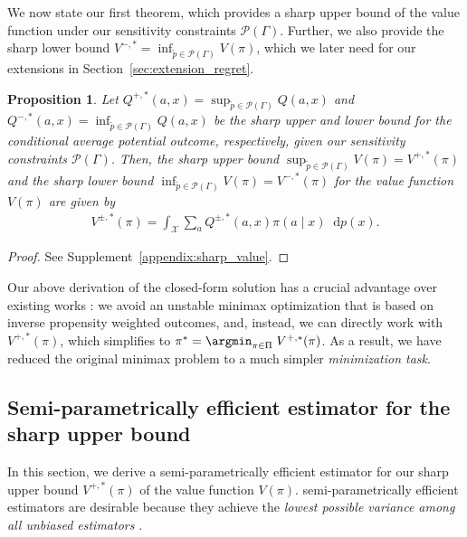 \documentclass{article} %
\theoremstyle{plain}
\newtheorem{proposition}[theorem]{Proposition}
\theoremstyle{definition}
\theoremstyle{remark}
\newcommand*\diff{\mathop{}\!\mathrm{d}}
\begin{document}
We now state our first theorem, which provides a sharp upper bound of the value function under our sensitivity constraints $\mathcal{P}(\Gamma)$. Further, we also provide the sharp lower bound $V^{-,*}=\inf_{\tilde{p}\in\mathcal{P}(\Gamma)}V(\pi)$, which we later need for our extensions in Section~\ref{sec:extension_regret}.

\begin{proposition}\label{prop:sharp_value}
    Let $Q^{+,*}(a,x) = \sup_{\tilde{p}\in \mathcal{P}(\Gamma)}Q(a,x)$ and $Q^{-,*}(a,x) = \inf_{\tilde{p}\in \mathcal{P}(\Gamma)}Q(a,x)$ be the sharp upper and lower bound for the conditional average potential outcome, respectively, given our sensitivity constraints $\mathcal{P}(\Gamma)$. Then, the sharp upper bound $\sup_{\tilde{p}\in \mathcal{P}(\Gamma)}V(\pi)=V^{+,*}(\pi)$ and the sharp lower bound $\inf_{\tilde{p}\in \mathcal{P}(\Gamma)}V(\pi)=V^{-,*}(\pi)$ for the value function $V(\pi)$ are given by
    \begin{align}\label{eq:sharp_value}
        V^{\pm,*}(\pi) = \int_\mathcal{X} \sum_a  Q^{\pm,*}(a,x) \pi(a\mid x) \diff p(x).
    \end{align}
\end{proposition}
\begin{proof}
    See Supplement~\ref{appendix:sharp_value}.
\end{proof}


Our above derivation of the closed-form solution has a crucial advantage over existing works \citep{Kallus.2018c, Kallus.2021d}: we avoid an unstable minimax optimization that is based on inverse propensity weighted outcomes, and, instead, we can directly work with $V^{+,*}(\pi)$, which simplifies  to
     $\pi^* = \argmin_{\pi \in \Pi} \; V^{+,*}(\pi)$.
As a result, we have reduced the original minimax problem to a much simpler \emph{minimization task}.

\subsection{Semi-parametrically efficient estimator for the sharp upper bound}\label{sec:efficient_estimator}

In this section, we derive a semi-parametrically efficient estimator for our sharp upper bound $V^{+,*}(\pi)$ of the value function $V(\pi)$. semi-parametrically efficient estimators are desirable because they achieve the \emph{lowest possible variance among all unbiased estimators} \citep{Hines2022,Kennedy.2022}.
\end{document}
